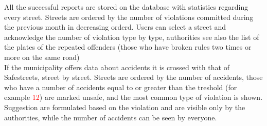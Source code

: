 All the successful reports are stored on the database with statistics regarding every street. Streets are ordered by the number of violations committed during the previous month in decreasing orderd. Users can select a street and acknowledge the number of violation type by type, authorities see also the list of the plates of the repeated offenders (those who have broken rules two times or more on the same road)\\

If the municipality offers data about accidents it is crossed with that of Safestreets, street by street. Streets are ordered by the number of accidents, those who have a number of accidents equal to or greater than the treshold (for example \textcolor{Red}{12}) are marked unsafe, and the most common type of violation is shown. Suggestion are formulated based on the violation and are visible only by the authorities, while the number of accidents can be seen by everyone.